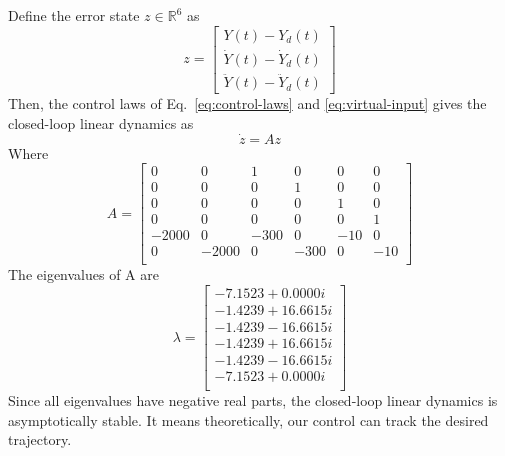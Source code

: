 \documentclass[letterpaper, 12pt]{article}
\begin{document}
\noindent Define the error state $z\in \mathbb{R}^6$ as
\begin{equation}
    z = 
    \begin{bmatrix}
        Y(t) - Y_d(t)\\
        \dot{Y}(t) - \dot{Y}_d(t)\\
        \ddot{Y}(t) - \ddot{Y}_d(t)
    \end{bmatrix}
\end{equation}
Then, the control laws of Eq.~\ref{eq:control-laws} and \ref{eq:virtual-input} gives the closed-loop linear dynamics as 
\begin{equation}
    \dot{z} = Az
\end{equation}
Where
\begin{equation*}
    A =
    \begin{bmatrix}
        0 & 0 & 1 & 0 & 0 & 0\\
        0 & 0 & 0 & 1 & 0 & 0\\
        0 & 0 & 0 & 0 & 1 & 0\\
        0 & 0 & 0 & 0 & 0 & 1\\
        -2000 & 0 & -300 & 0 & -10 & 0\\
        0 & -2000 & 0 & -300 & 0 & -10\\
    \end{bmatrix}
\end{equation*}
The eigenvalues of A are 
\begin{equation*}
    \lambda = 
    \begin{bmatrix}
    -7.1523 + 0.0000i\\
    -1.4239 +16.6615i\\
    -1.4239 -16.6615i\\
    -1.4239 +16.6615i\\
    -1.4239 -16.6615i\\
    -7.1523 + 0.0000i\\
    \end{bmatrix}
\end{equation*}
Since all eigenvalues have negative real parts, the closed-loop linear dynamics is asymptotically stable. It means theoretically, our control can track the desired trajectory.
\end{document}
